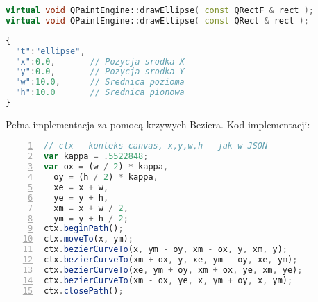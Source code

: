 \begin{lstlisting}[language=C++,numbers=none]
virtual void QPaintEngine::drawEllipse( const QRectF & rect );
virtual void QPaintEngine::drawEllipse( const QRect & rect );
\end{lstlisting}
\begin{lstlisting}[language=JavaScript,numbers=none]
{
  "t":"ellipse",
  "x":0.0,       // Pozycja srodka X
  "y":0.0,       // Pozycja srodka Y
  "w":10.0,      // Srednica pozioma
  "h":10.0       // Srednica pionowa
}
\end{lstlisting}

Pełna implementacja za pomocą krzywych Beziera.
Kod implementacji:

\begin{lstlisting}[language=JavaScript,numbers=left]
// ctx - konteks canvas, x,y,w,h - jak w JSON
var kappa = .5522848;
var ox = (w / 2) * kappa,
  oy = (h / 2) * kappa,
  xe = x + w,
  ye = y + h,
  xm = x + w / 2,
  ym = y + h / 2;
ctx.beginPath();
ctx.moveTo(x, ym);
ctx.bezierCurveTo(x, ym - oy, xm - ox, y, xm, y);
ctx.bezierCurveTo(xm + ox, y, xe, ym - oy, xe, ym);
ctx.bezierCurveTo(xe, ym + oy, xm + ox, ye, xm, ye);
ctx.bezierCurveTo(xm - ox, ye, x, ym + oy, x, ym);
ctx.closePath();
\end{lstlisting}